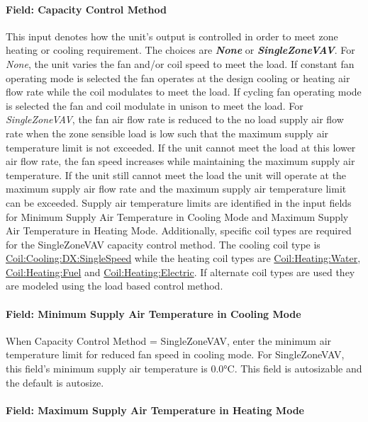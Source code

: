 \paragraph{Field: Capacity Control Method}\label{field-capacity-control-method-2}

This input denotes how the unit's output is controlled in order to meet zone heating or cooling requirement. The choices are \textbf{\emph{None}} or \textbf{\emph{SingleZoneVAV}}. For \emph{None}, the unit varies the fan and/or coil speed to meet the load. If constant fan operating mode is selected the fan operates at the design cooling or heating air flow rate while the coil modulates to meet the load. If cycling fan operating mode is selected the fan and coil modulate in unison to meet the load. For \emph{SingleZoneVAV}, the fan air flow rate is reduced to the no load supply air flow rate when the zone sensible load is low such that the maximum supply air temperature limit is not exceeded. If the unit cannot meet the load at this lower air flow rate, the fan speed increases while maintaining the maximum supply air temperature. If the unit still cannot meet the load the unit will operate at the maximum supply air flow rate and the maximum supply air temperature limit can be exceeded. Supply air temperature limits are identified in the input fields for Minimum Supply Air Temperature in Cooling Mode and Maximum Supply Air Temperature in Heating Mode. Additionally, specific coil types are required for the SingleZoneVAV capacity control method. The cooling coil type is \hyperref[coilcoolingdxsinglespeed]{Coil:Cooling:DX:SingleSpeed} while the heating coil types are \hyperref[coilheatingwater]{Coil:Heating:Water}, \hyperref[coilheatinggas-000]{Coil:Heating:Fuel} and \hyperref[coilheatingelectric]{Coil:Heating:Electric}. If alternate coil types are used they are modeled using the load based control method.

\paragraph{Field: Minimum Supply Air Temperature in Cooling Mode}\label{field-minimum-supply-air-temperature-in-cooling-mode-2}

When Capacity Control Method = SingleZoneVAV, enter the minimum air temperature limit for reduced fan speed in cooling mode. For SingleZoneVAV, this field's minimum supply air temperature is 0.0\si{\degreeCelsius}. This field is autosizable and the default is autosize.

\paragraph{Field: Maximum Supply Air Temperature in Heating Mode}\label{field-maximum-supply-air-temperature-in-heating-mode-2}

